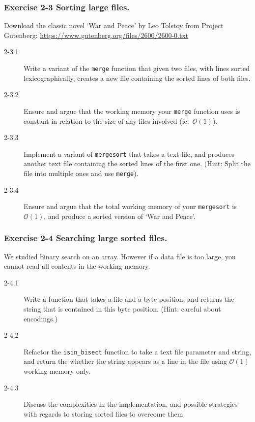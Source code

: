 \documentclass{beamer} %
\begin{document}
\begin{frame}
\frametitle{Exercise 2-3 Sorting large files.}

Download the classic novel `War and Peace' by Leo Tolstoy from Project Gutenberg: \url{https://www.gutenberg.org/files/2600/2600-0.txt}
\begin{description}
	\item[2-3.1] Write a variant of the \texttt{merge} function that given two files, with lines sorted lexicographically, creates a new file containing the sorted lines of both files.
	\item[2-3.2] Ensure and argue that the working memory your \texttt{merge} function uses is constant in relation to the size of any files involved (ie.\ $\mathcal{O}(1)$).
	\item[2-3.3] Implement a variant of \texttt{mergesort} that takes a text file, and produces another text file containing the sorted lines of the first one. (Hint: Split the file into multiple ones and use \texttt{merge}).
	\item[2-3.4] Ensure and argue that the total working memory of your \texttt{mergesort} is $\mathcal{O}(1)$, and produce a sorted version of `War and Peace'.
\end{description}

\end{frame}

\begin{frame}
\frametitle{Exercise 2-4 Searching large sorted files.}

We studied binary search on an array. However if a data file is too large, you cannot read all contents in the working memory.
\begin{description}
	\item[2-4.1] Write a function that takes a file and a byte position, and returns the string that is contained in this byte position. (Hint: careful about encodings.)
	\item[2-4.2] Refactor the \texttt{isin\_bisect} function to take a text file parameter and string, and return the whether the string appears as a line in the file using $\mathcal{O}(1)$ working memory only.
	\item[2-4.3] Discuss the complexities in the implementation, and possible strategies with regards to storing sorted files to overcome them.
\end{description}

\end{frame}



\end{document}

